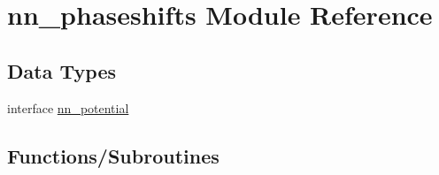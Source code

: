 \hypertarget{namespacenn__phaseshifts}{}\section{nn\+\_\+phaseshifts Module Reference}
\label{namespacenn__phaseshifts}
\subsection*{Data Types}
\begin{DoxyCompactItemize}
\item 
interface \hyperlink{interfacenn__phaseshifts_1_1nn__potential}{nn\+\_\+potential}
\end{DoxyCompactItemize}
\subsection*{Functions/\+Subroutines}
